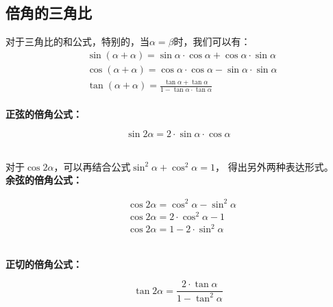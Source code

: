 \documentclass[UTF8]{ctexart}
\begin{document}
\subsection{倍角的三角比}
    对于三角比的和公式，特别的，当$\alpha=\beta$时，我们可以有：
    \begin{align}
        &\sin{(\alpha+\alpha)}=\sin{\alpha}\cdot\cos{\alpha}+\cos{\alpha}\cdot\sin{\alpha}\\[3mm]
        &\cos{(\alpha+\alpha)}=\cos{\alpha}\cdot\cos{\alpha}-\sin{\alpha}\cdot\sin{\alpha}\\[3mm]
        &\tan{(\alpha+\alpha)}=\frac{\tan{\alpha}+\tan{\alpha}}{1-\tan{\alpha}\cdot\tan{\alpha}}
    \end{align}\\
    \textbf{正弦的倍角公式：}
    \begin{large}
    \begin{equation*}
        \sin{2\alpha}=2\cdot\sin{\alpha}\cdot\cos{\alpha}
    \end{equation*}
    \end{large}\\
    对于$\cos{2\alpha}$，可以再结合公式$\sin^2{\alpha}+\cos^2{\alpha}=1$，
    得出另外两种表达形式。\\[3mm]
    \textbf{余弦的倍角公式：}
    \begin{large}
    \begin{align*}
        &\cos{2\alpha}=\cos^2{\alpha}-\sin^2{\alpha}\\[3mm]
        &\cos{2\alpha}=2\cdot\cos^2{\alpha}-1\\[3mm]
        &\cos{2\alpha}=1-2\cdot\sin^2{\alpha}
    \end{align*}
    \end{large}\\
    \textbf{正切的倍角公式：}
    \begin{large}
    \begin{equation*}
        \tan{2\alpha}=\frac{2\cdot\tan{\alpha}}{1-\tan^2{\alpha}}
    \end{equation*}
    \end{large}
    
\newpage
\end{document}
